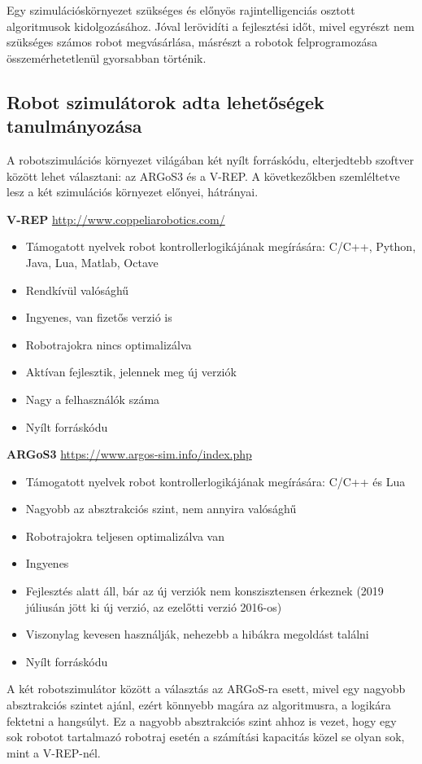 Egy szimulációskörnyezet szükséges és előnyös rajintelligenciás osztott algoritmusok kidolgozásához. Jóval lerövidíti a fejlesztési időt,
mivel egyrészt nem szükséges számos robot megvásárlása, másrészt a robotok felprogramozása összemérhetetlenül gyorsabban történik.

\subsection{Robot szimulátorok adta lehetőségek tanulmányozása} 

A robotszimulációs környezet világában két nyílt forráskódu, elterjedtebb szoftver között lehet választani: az ARGoS3 és a V-REP.
A következőkben szemléltetve lesz a két szimulációs környezet előnyei, hátrányai.

\textbf{V-REP} \url{http://www.coppeliarobotics.com/}
\begin{itemize}
    \item Támogatott nyelvek robot kontrollerlogikájának megírására: C/C++, Python, Java, Lua, Matlab, Octave
    \item Rendkívül valósághű
    \item Ingyenes, van fizetős verzió is
    \item Robotrajokra nincs optimalizálva
    \item Aktívan fejlesztik, jelennek meg új verziók
    \item Nagy a felhasználók száma
    \item Nyílt forráskódu
\end{itemize}

\textbf{ARGoS3} \url{https://www.argos-sim.info/index.php}
\begin{itemize}
    \item Támogatott nyelvek robot kontrollerlogikájának megírására: C/C++ és Lua
    \item Nagyobb az absztrakciós szint, nem annyira valósághű
    \item Robotrajokra teljesen optimalizálva van
    \item Ingyenes
    \item Fejlesztés alatt áll, bár az új verziók nem konszisztensen érkeznek (2019 júliusán jött ki új verzió, az ezelőtti verzió 2016-os)
    \item Viszonylag kevesen használják, nehezebb a hibákra megoldást találni
    \item Nyílt forráskódu
\end{itemize}

A két robotszimulátor között a választás az ARGoS-ra esett, mivel egy nagyobb absztrakciós szintet ajánl, ezért könnyebb magára az algoritmusra, a logikára fektetni a hangsúlyt. 
Ez a nagyobb absztrakciós szint ahhoz is vezet, hogy egy sok robotot tartalmazó robotraj esetén a számítási kapacitás közel se olyan sok, mint a V-REP-nél. 




